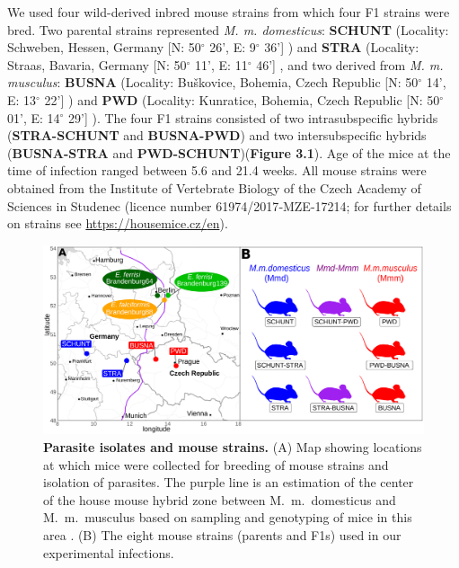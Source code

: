 We used four wild-derived inbred mouse strains from which four F1 strains were bred. Two parental strains represented \textit{M. m. domesticus}: \textbf{SCHUNT} (Locality: Schweben, Hessen, Germany [N: 50$ ^{\circ} $  26’, E: 9$ ^{\circ} $  36’] \citep{martincova_phenotypic_2019}) and \textbf{STRA} (Locality: Straas, Bavaria, Germany [N: 50$ ^{\circ} $  11’, E: 11$ ^{\circ} $  46’] \citep{pialek_development_2008}, and two derived from \textit{M. m. musculus}: \textbf{BUSNA} (Locality: Buškovice, Bohemia, Czech Republic [N: 50$ ^{\circ} $  14’, E: 13$ ^{\circ} $  22’] \citep{pialek_development_2008}) and \textbf{PWD} (Locality: Kunratice, Bohemia, Czech Republic [N: 50$ ^{\circ} $  01’, E: 14$ ^{\circ} $  29’] \citep{gregorova_pwdph_2000}). The four F1 strains consisted of two intrasubspecific hybrids (\textbf{STRA-SCHUNT }and \textbf{BUSNA-PWD}) and two intersubspecific hybrids (\textbf{BUSNA-STRA} and  \textbf{PWD-SCHUNT})(\textbf{Figure 3.1}). Age of the mice at the time of infection ranged between 5.6 and 21.4 weeks. All mouse strains were obtained from the Institute of Vertebrate Biology of the Czech Academy of Sciences in Studenec (licence number 61974/2017‐MZE‐17214; for further details on strains see \href{https://housemice.cz/en}{\textcolor[HTML]{00000A}{https://housemice.cz/}\href{https://housemice.cz/en}{en}}).\par

\begin{figure}[H]
    \centering
    \includegraphics[width=\linewidth,height=\textheight,keepaspectratio]{images/3article2/Fig1_final.pdf}
    \caption{\textbf{Parasite isolates and mouse strains.} (A) Map showing locations at which mice were collected for breeding of mouse strains and isolation of parasites. The purple line is an estimation of the center of the house mouse hybrid zone between M. m. domesticus and M. m. musculus based on sampling and genotyping of mice in this area \citep{Balard2020, dureje_mouse_2012, macholan_widespread_2019}. (B) The eight mouse strains (parents and F1s) used in our experimental infections.}
\end{figure}


